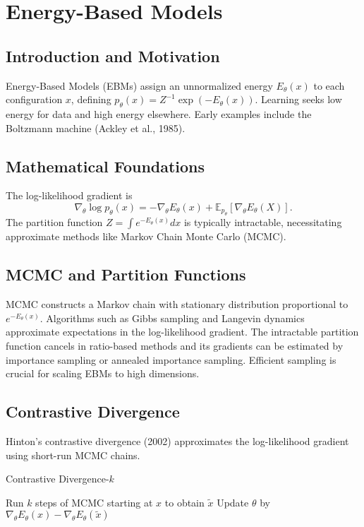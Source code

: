 \section{Energy-Based Models}
\subsection{Introduction and Motivation}
Energy-Based Models (EBMs) assign an unnormalized energy $E_\theta(x)$ to each configuration $x$, defining $p_\theta(x)=Z^{-1}\exp(-E_\theta(x))$. Learning seeks low energy for data and high energy elsewhere. Early examples include the Boltzmann machine (Ackley et al., 1985).

\subsection{Mathematical Foundations}
The log-likelihood gradient is
\begin{equation}
\nabla_\theta \log p_\theta(x)= -\nabla_\theta E_\theta(x)+\mathbb{E}_{p_\theta}[\nabla_\theta E_\theta(X)].
\end{equation}
The partition function $Z=\int e^{-E_\theta(x)}dx$ is typically intractable, necessitating approximate methods like Markov Chain Monte Carlo (MCMC).

\subsection{MCMC and Partition Functions}
MCMC constructs a Markov chain with stationary distribution proportional to $e^{-E_\theta(x)}$. Algorithms such as Gibbs sampling and Langevin dynamics approximate expectations in the log-likelihood gradient. The intractable partition function cancels in ratio-based methods and its gradients can be estimated by importance sampling or annealed importance sampling. Efficient sampling is crucial for scaling EBMs to high dimensions.

\subsection{Contrastive Divergence}
Hinton's contrastive divergence (2002) approximates the log-likelihood gradient using short-run MCMC chains.
\begin{algorithm}
\caption{Contrastive Divergence-$k$}
\begin{algorithmic}[1]
    \STATE Run $k$ steps of MCMC starting at $x$ to obtain $\tilde{x}$
    \STATE Update $\theta$ by $\nabla_\theta E_\theta(x)-\nabla_\theta E_\theta(\tilde{x})$
\ENDFOR
\end{algorithmic}
\end{algorithm}

